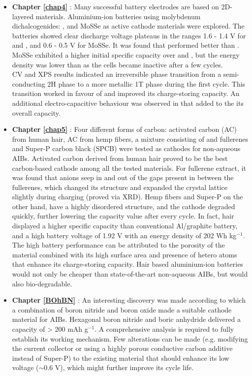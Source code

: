 \begin{itemize}

\item \textbf{Chapter \ref{chap4}} : Many successful battery electrodes are based on 2D-layered materials. Aluminium-ion batteries using molybdenum dichalcogenides: ,  and MoSSe as active cathode materials were explored. The batteries showed clear discharge voltage plateaus in the ranges 1.6 - 1.4 V for  and , and 0.6 - 0.5 V for MoSSe. It was found that  performed better than . MoSSe exhibited a higher initial specific capacity over  and , but the energy density was lower than  as the cells became inactive after a few cycles.  \\
CV and XPS results indicated an irreversible phase transition from a semi-conducting 2H phase to a more metallic 1T phase during the first cycle. This transition worked in favour of  and improved its charge-storing capacity. An additional electro-capacitive behaviour was observed in  that added to the its overall capacity.

\item \textbf{Chapter \ref{chap5}} : Four different forms of carbon: activated carbon (AC) from human hair, AC from hemp fibers, a mixture consisting of  and  fullerenes and Super-P carbon black (SPCB) were tested as cathodes for non-aqueous AIBs. Activated carbon derived from human hair proved to be the best carbon-based cathode among all the tested materials. For fullerene extract, it was found that  anions seep in and out of the gaps present in between the fullerenes, which changed its structure and expanded the crystal lattice slightly during charging (proved via XRD). Hemp fibers and Super-P on the other hand, have a highly disordered structure, and the cathode degraded quickly, further lowering the capacity value after every cycle. In fact, hair displayed a higher specific capacity than conventional Al/graphite battery, and a high battery voltage of 1.92 V with an energy density of 202 Wh kg$^{-1}$. The high battery performance can be attributed to the porosity of the material combined with its high surface area and presence of hetero atoms that enhance its charge-storing capacity. Hair based aluminium-ion batteries would not only be cheaper than state-of-the-art non-aqueous AIBs, but would also bio-degradable.

\item \textbf{Chapter \ref{BOhBN}} : An interesting discovery was made according to which a combination of boron nitride and boron oxide made a suitable cathode material for AIBs. Hexagonal boron nitride and boric anhydride delivered a capacity of > 200 mAh g$^{-1}$. A comprehensive analysis is required to fully establish its working mechanism. Few alterations can be made (e.g. modifying the current collector or using a highly porous conductive carbon additive instead of Super-P) to the existing material that should enhance its low voltage ($\sim$0.6 V), which might further improve its cycle life. 
\end{itemize}

